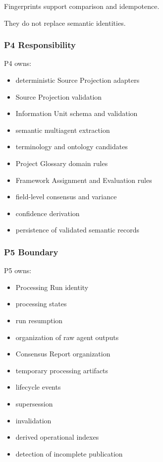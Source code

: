 Fingerprints support comparison and idempotence.

They do not replace semantic identities.

\hypertarget{p4-responsibility}{%
\subsubsection{P4 Responsibility}\label{p4-responsibility}}

P4 owns:

\begin{itemize}
\tightlist
\item
  deterministic Source Projection adapters
\item
  Source Projection validation
\item
  Information Unit schema and validation
\item
  semantic multiagent extraction
\item
  terminology and ontology candidates
\item
  Project Glossary domain rules
\item
  Framework Assignment and Evaluation rules
\item
  field-level consensus and variance
\item
  confidence derivation
\item
  persistence of validated semantic records
\end{itemize}

\hypertarget{p5-boundary}{%
\subsubsection{P5 Boundary}\label{p5-boundary}}

P5 owns:

\begin{itemize}
\tightlist
\item
  Processing Run identity
\item
  processing states
\item
  run resumption
\item
  organization of raw agent outputs
\item
  Consensus Report organization
\item
  temporary processing artifacts
\item
  lifecycle events
\item
  supersession
\item
  invalidation
\item
  derived operational indexes
\item
  detection of incomplete publication
\end{itemize}

